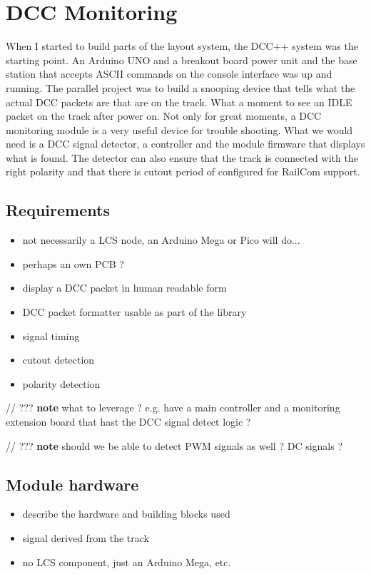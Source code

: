 \chapter{DCC Monitoring}

When I started to build parts of the layout system, the DCC++ system was the starting point. An Arduino UNO and a breakout board power unit and the base station that accepts ASCII commands on the console interface was up and running. The parallel project was to build a snooping device that tells what the actual DCC packets are that are on the track. What a moment to see an IDLE packet on the track after power on. Not only for great moments, a DCC monitoring module is a very useful device for trouble shooting. What we would need is a DCC signal detector, a controller and the module firmware that displays what is found. The detector can also ensure that the track is connected with the right polarity and that there is cutout period of configured for RailCom support.

\section{Requirements}

\begin{itemize}
\item not necessarily a LCS node, an Arduino Mega or Pico will do...
\item perhaps an own PCB ?
\item display a DCC packet in human readable form
\item DCC packet formatter usable as part of the library
\item signal timing
\item cutout detection
\item polarity detection
\end{itemize}

// ??? \textbf{note} what to leverage ? e.g. have a main controller and a monitoring extension board that hast the DCC signal detect logic ?

// ??? \textbf{note} should we be able to detect PWM signals as well ? DC signals ?


\section{Module hardware}

\begin{itemize}
\item describe the hardware and building blocks used
\item signal derived from the track
\item no LCS component, just an Arduino Mega, etc.
\end{itemize}


